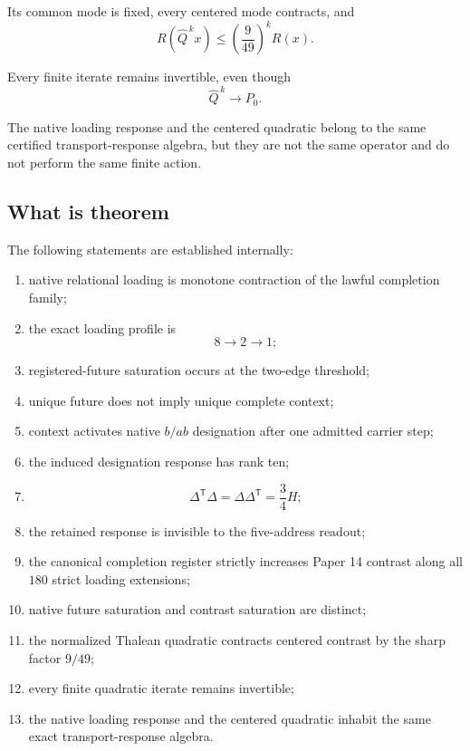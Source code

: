 Its common mode is fixed, every centered mode contracts, and
\[
R(\widehat Q^{\,k}x)
\le
\left(\frac9{49}\right)^kR(x).
\]

Every finite iterate remains invertible, even though
\[
\widehat Q^{\,k}\longrightarrow P_0.
\]

The native loading response and the centered quadratic belong to the
same certified transport-response algebra, but they are not the same
operator and do not perform the same finite action.

\subsection{What is theorem}

The following statements are established internally:

\begin{enumerate}[label=(\roman*)]

\item native relational loading is monotone contraction of the lawful
completion family;

\item the exact loading profile is
\[
8\to2\to1;
\]

\item registered-future saturation occurs at the two-edge threshold;

\item unique future does not imply unique complete context;

\item context activates native \(b/ab\) designation after one admitted
carrier step;

\item the induced designation response has rank ten;

\item
\[
\Delta^{\mathsf T}\Delta
=
\Delta\Delta^{\mathsf T}
=
\frac34H;
\]

\item the retained response is invisible to the five-address readout;

\item the canonical completion register strictly increases Paper 14
contrast along all \(180\) strict loading extensions;

\item native future saturation and contrast saturation are distinct;

\item the normalized Thalean quadratic contracts centered contrast by
the sharp factor \(9/49\);

\item every finite quadratic iterate remains invertible;

\item the native loading response and the centered quadratic inhabit
the same exact transport-response algebra.

\end{enumerate}


